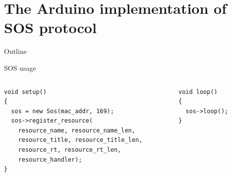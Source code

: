 \section {The Arduino implementation of SOS protocol}
\begin{frame} {Outline}
    \tableofcontents [current]
\end{frame}

\begin{frame}[containsverbatim]{SOS usage}
	\begin{columns}[c]
		\begin{column}[c]{.6\textwidth}
\begin{Verbatim}[fontsize=\scriptsize]
void setup() 
{
  sos = new Sos(mac_addr, 169);
  sos->register_resource(
    resource_name, resource_name_len, 
    resource_title, resource_title_len,
    resource_rt, resource_rt_len,
    resource_handler);
}
\end{Verbatim}
		\end{column}
		\begin{column}[c]{.4\textwidth}
\begin{Verbatim}[fontsize=\scriptsize]
void loop() 
{
  sos->loop();
}
\end{Verbatim}
		\end{column}
	\end{columns}
\end{frame}

